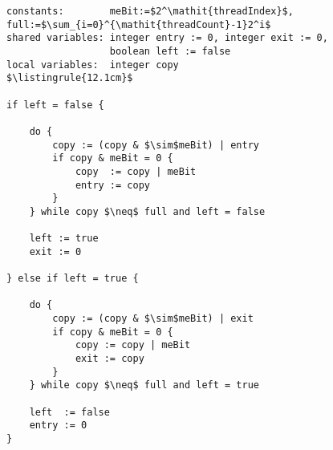 \begin{minipage}
\centering
\begin{lstlisting}[mathescape, linewidth=12.1cm]
constants:        meBit:=$2^\mathit{threadIndex}$, full:=$\sum_{i=0}^{\mathit{threadCount}-1}2^i$
shared variables: integer entry := 0, integer exit := 0,
                  boolean left := false
local variables:  integer copy
$\listingrule{12.1cm}$

if left = false {

	do {
		copy := (copy & $\sim$meBit) | entry
		if copy & meBit = 0 {
			copy  := copy | meBit
			entry := copy
		}
	} while copy $\neq$ full and left = false

	left := true
	exit := 0

} else if left = true {

	do {
		copy := (copy & $\sim$meBit) | exit
		if copy & meBit = 0 {
			copy := copy | meBit
			exit := copy
		}
	} while copy $\neq$ full and left = true

	left  := false
	entry := 0
}
\end{lstlisting}
\end{minipage}
